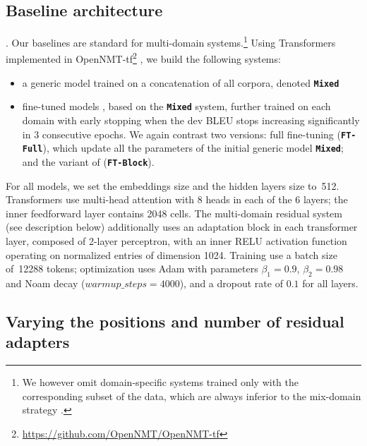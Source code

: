 \documentclass[11pt,a4paper]{article}
\newcommand{\fyTodo}[1]{\Todo[FY:]{\textcolor{orange}{#1}}}
\newcommand{\fyDone}[1]{\done[FY]\Todo[FY:]{\textcolor{orange}{#1}}}
\newcommand{\system}[1]{\texttt{\textbf{#1}}}
\begin{document}
\subsection{Baseline architecture \label{ssec:baseline}}
\fyTodo{Write this - settings and parameters for Mix-Nat and Full-FT}.
Our baselines are standard for multi-domain systems.\footnote{We however omit domain-specific systems trained only with the corresponding subset of the data, which are always inferior to the mix-domain strategy \cite{Britz17mixing}.} Using Transformers \cite{Vaswani17attention} implemented in OpenNMT-tf\footnote{\url{https://github.com/OpenNMT/OpenNMT-tf}} \cite{Klein17opennmt}, we build the following systems:
\begin{itemize}
\item a generic model trained on a concatenation of all corpora, denoted \system{Mixed}\fyTodo{Or mixed nat ?}
\item fine-tuned models \cite{Luong15stanford,Freitag16fast}, based on the \system{Mixed} system, further trained on each domain with early stopping when the dev BLEU stops increasing significantly in 3 consecutive epochs. We again contrast two versions: full fine-tuning (\system{FT-Full}), which update all the parameters of the initial generic model \system{Mixed}; and the variant of \cite{Bapna19simple} (\system{FT-Block}).
\end{itemize}

For all models, we set the embeddings size and the hidden layers size to~512. Transformers use multi-head attention with 8 heads in each of the 6 layers; the inner feedforward layer contains 2048 cells. The multi-domain residual system (see description below) additionally uses an adaptation block in each transformer layer, composed of 2-layer perceptron, with an inner RELU activation function operating on normalized entries of dimension 1024. 
Training use a batch size of~12288 tokens; optimization uses Adam with parameters $\beta_1=0.9$, $\beta_2= 0.98$ and Noam decay ($warmup\_steps=4000$), and a dropout rate of $0.1$ for all layers.\fyDone{Describe the block adaptation layer - voir slides}

\subsection{Varying the positions and number of residual adapters}
\end{document}
